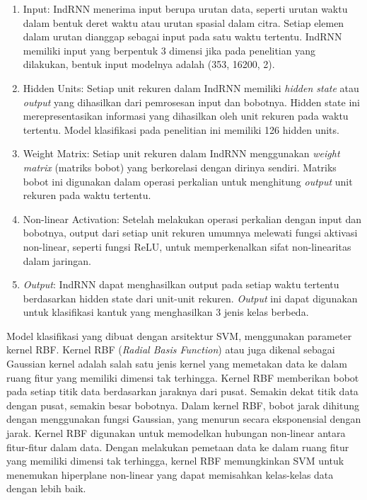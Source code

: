 \begin{enumerate}[nolistsep]
      \item Input: IndRNN menerima input berupa urutan data, seperti urutan waktu dalam bentuk deret waktu atau urutan spasial dalam citra.
            Setiap elemen dalam urutan dianggap sebagai input pada satu waktu tertentu. IndRNN memiliki input yang berpentuk 3 dimensi jika
            pada penelitian yang dilakukan, bentuk input modelnya adalah (353, 16200, 2).

      \item Hidden Units: Setiap unit rekuren dalam IndRNN memiliki \emph{hidden state} atau \emph{output} yang dihasilkan dari pemrosesan input dan
            bobotnya. Hidden state ini merepresentasikan informasi yang dihasilkan oleh unit rekuren pada waktu tertentu. Model klasifikasi
            pada penelitian ini memiliki 126 hidden units.

      \item Weight Matrix: Setiap unit rekuren dalam IndRNN menggunakan \emph{weight matrix} (matriks bobot) yang berkorelasi dengan dirinya sendiri.
            Matriks bobot ini digunakan dalam operasi perkalian untuk menghitung \emph{output} unit rekuren pada waktu tertentu.

      \item Non-linear Activation: Setelah melakukan operasi perkalian dengan input dan bobotnya, output dari setiap unit rekuren umumnya
            melewati fungsi aktivasi non-linear, seperti fungsi ReLU, untuk memperkenalkan sifat non-linearitas dalam jaringan.

      \item \emph{Output}: IndRNN dapat menghasilkan output pada setiap waktu tertentu berdasarkan hidden state dari unit-unit rekuren. \emph{Output} ini
            dapat digunakan untuk klasifikasi kantuk yang menghasilkan 3 jenis kelas berbeda.

\end{enumerate}

Model klasifikasi yang dibuat dengan arsitektur SVM, menggunakan parameter kernel RBF.
Kernel RBF (\emph{Radial Basis Function}) atau juga dikenal sebagai Gaussian kernel adalah
salah satu jenis kernel yang memetakan data ke dalam ruang fitur yang memiliki dimensi tak
terhingga. Kernel RBF memberikan bobot pada setiap titik data berdasarkan jaraknya dari pusat.
Semakin dekat titik data dengan pusat, semakin besar bobotnya. Dalam kernel RBF, bobot jarak
dihitung dengan menggunakan fungsi Gaussian, yang menurun secara eksponensial dengan
jarak. Kernel RBF digunakan untuk memodelkan hubungan non-linear antara fitur-fitur dalam
data. Dengan melakukan pemetaan data ke dalam ruang fitur yang memiliki dimensi tak
terhingga, kernel RBF memungkinkan SVM untuk menemukan hiperplane non-linear yang
dapat memisahkan kelas-kelas data dengan lebih baik.



